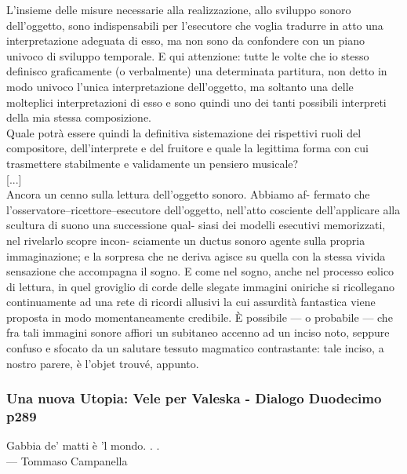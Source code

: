 \documentclass[12pt,a4paper]{article}
\begin{document}
L’insieme delle misure necessarie alla
realizzazione, allo sviluppo sonoro dell’oggetto, sono indispensabili per
l’esecutore che voglia tradurre in atto una interpretazione adeguata di esso,
ma non sono da confondere con un piano univoco di sviluppo temporale.
E qui attenzione: tutte le volte che io stesso definisco graficamente (o
verbalmente) una determinata partitura, non detto in modo univoco l’unica
interpretazione dell’oggetto, ma soltanto una delle molteplici interpretazioni
di esso e sono quindi uno dei tanti possibili interpreti della mia stessa
composizione.\\


Quale potrà essere quindi la definitiva sistemazione dei rispettivi ruoli
del compositore, dell’interprete e del fruitore e quale la legittima
forma con cui trasmettere stabilmente e validamente un pensiero
musicale?\\

[...]\\

Ancora un cenno sulla lettura dell’oggetto sonoro. Abbiamo af-
fermato che l’osservatore–ricettore–esecutore dell’oggetto, nell’atto
cosciente dell’applicare alla scultura di suono una successione qual-
siasi dei modelli esecutivi memorizzati, nel rivelarlo scopre incon-
sciamente un ductus sonoro agente sulla propria immaginazione; e la
sorpresa che ne deriva agisce su quella con la stessa vivida sensazione
che accompagna il sogno. E come nel sogno, anche nel processo
eolico di lettura, in quel groviglio di corde delle slegate immagini
oniriche si ricollegano continuamente ad una rete di ricordi allusivi la
cui assurdità fantastica viene proposta in modo momentaneamente
credibile. È possibile — o probabile — che fra tali immagini sonore
affiori un subitaneo accenno ad un inciso noto, seppure confuso e
sfocato da un salutare tessuto magmatico contrastante: tale inciso, a
nostro parere, è l’objet trouvé, appunto.

\subsubsection{Una nuova Utopia: Vele per Valeska - Dialogo Duodecimo p289}

Gabbia de’ matti è ’l mondo. . .\\
— Tommaso Campanella\\
\end{document}
